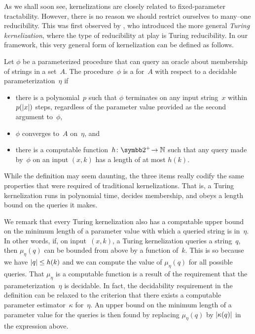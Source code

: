 As we shall soon see, kernelizations are closely related to fixed-parameter tractability.
However, there is no reason we should restrict ourselves to many--one reducibility.
This was first observed by \textcite{lokshtanov2009new}, who introduced the more general \emph{Turing kernelization}, where the type of reducibility at play is Turing reducibility.
In our framework, this very general form of kernelization can be defined as follows.
\begin{definition}
\label{def:turing_kernelization}%
  Let $\phi$ be a parameterized procedure that can query an oracle about membership of strings in a set~$A$.
  The procedure~$\phi$ is a  for~$A$ with respect to a decidable parameterization~$\eta$ if
  \begin{itemize}
  \item there is a polynomial~$p$ such that $\phi$ terminates on any input string~$x$ within $p({\lvert x\rvert})$ steps, regardless of the parameter value provided as the second argument to~$\phi$,
  \item $\phi$ converges to~$A$ on~$\eta$, and
  \item there is a computable function~$h\colon \binary^+\! \to \bbN$ such that any query made by~$\phi$ on an input $(x, k)$ has a length of at most $h(k)$.
  \end{itemize}
\end{definition}
While the definition may seem daunting, the three items really codify the same properties that were required of traditional kernelizations.
That is, a Turing kernelization runs in polynomial time, decides membership, and obeys a length bound on the queries it makes.

We remark that every Turing kernelization also has a computable upper bound on the minimum length of a parameter value with which a queried string is in~$\eta$.
In other words, if, on input~$(x, k)$, a Turing kernelization queries a string~$q$, then $\mu_\eta(q)$ can be bounded from above by a function of~$k$.
This is so because we have ${\lvert q\rvert} \le h(k)$ and we can compute the value of $\mu_\eta(q)$ for all possible queries.
That $\mu_\eta$ is a computable function is a result of the requirement that the parameterization~$\eta$ is decidable.
In fact, the decidability requirement in the definition can be relaxed to the criterion that there exists a computable parameter estimator~$\kappa$ for~$\eta$.
An upper bound on the minimum length of a parameter value for the queries is then found by replacing $\mu_\eta(q)$ by ${\lvert\kappa(q)\rvert}$ in the expression above.

